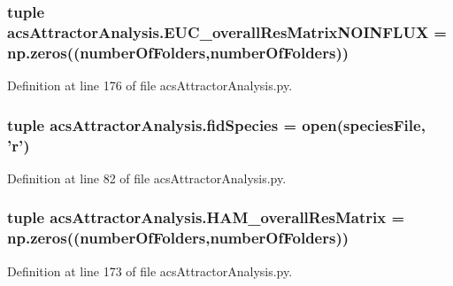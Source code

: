 \hypertarget{a00096_a4214c876be4247f0643fc749beb35787}{
\subsubsection[{E\-U\-C\-\_\-overall\-Res\-Matrix\-N\-O\-I\-N\-F\-L\-U\-X}]{\setlength{\rightskip}{0pt plus 5cm}tuple acs\-Attractor\-Analysis.\-E\-U\-C\-\_\-overall\-Res\-Matrix\-N\-O\-I\-N\-F\-L\-U\-X = np.\-zeros(({\bf number\-Of\-Folders},{\bf number\-Of\-Folders}))}}\label{a00096_a4214c876be4247f0643fc749beb35787}


Definition at line 176 of file acs\-Attractor\-Analysis.\-py.

\hypertarget{a00096_a604c9f75892d8d8aeac8306c94630a23}{
\subsubsection[{fid\-Species}]{\setlength{\rightskip}{0pt plus 5cm}tuple acs\-Attractor\-Analysis.\-fid\-Species = open({\bf species\-File}, '{\bf r}')}}\label{a00096_a604c9f75892d8d8aeac8306c94630a23}


Definition at line 82 of file acs\-Attractor\-Analysis.\-py.

\hypertarget{a00096_a46dc8cdfb545b64952370e51ff02336f}{
\subsubsection[{H\-A\-M\-\_\-overall\-Res\-Matrix}]{\setlength{\rightskip}{0pt plus 5cm}tuple acs\-Attractor\-Analysis.\-H\-A\-M\-\_\-overall\-Res\-Matrix = np.\-zeros(({\bf number\-Of\-Folders},{\bf number\-Of\-Folders}))}}\label{a00096_a46dc8cdfb545b64952370e51ff02336f}


Definition at line 173 of file acs\-Attractor\-Analysis.\-py.

